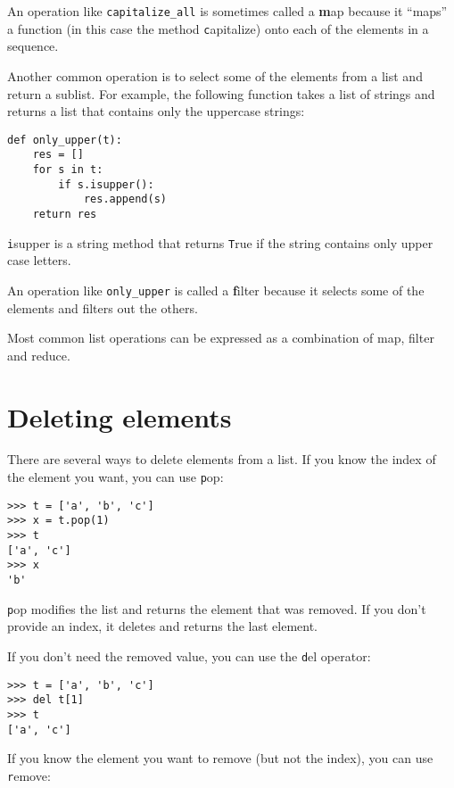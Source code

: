 \documentclass[
DIV=11,
fontsize=12,
twoside,
headinclude=false,
titlepage=firstiscover,
abstract=true,
headsepline=true,
footsepline=true,
chapterprefix=true, %
headings=big,
bibliography=totoc,%
captions=tableheading
]{scrbook}
\theoremstyle{definition}
\begin{document}
An operation like \verb"capitalize_all" is sometimes called a {\textbf
map} because it ``maps'' a function (in this case the method {\texttt
capitalize}) onto each of the elements in a sequence.

Another common operation is to select some of the elements from
a list and return a sublist.  For example, the following
function takes a list of strings and returns a list that contains
only the uppercase strings:

\begin{lstlisting}
def only_upper(t):
    res = []
    for s in t:
        if s.isupper():
            res.append(s)
    return res
\end{lstlisting}
%
{\texttt isupper} is a string method that returns {\texttt True} if
the string contains only upper case letters.

An operation like \verb"only_upper" is called a {\textbf filter} because
it selects some of the elements and filters out the others.

Most common list operations can be expressed as a combination
of map, filter and reduce.


\section{Deleting elements}

There are several ways to delete elements from a list.  If you
know the index of the element you want, you can use
{\texttt pop}:

\begin{lstlisting}
>>> t = ['a', 'b', 'c']
>>> x = t.pop(1)
>>> t
['a', 'c']
>>> x
'b'
\end{lstlisting}
%
{\texttt pop} modifies the list and returns the element that was removed.
If you don't provide an index, it deletes and returns the
last element.

If you don't need the removed value, you can use the {\texttt del}
operator:

\begin{lstlisting}
>>> t = ['a', 'b', 'c']
>>> del t[1]
>>> t
['a', 'c']
\end{lstlisting}
%
If you know the element you want to remove (but not the index), you
can use {\texttt remove}:
\end{document}
